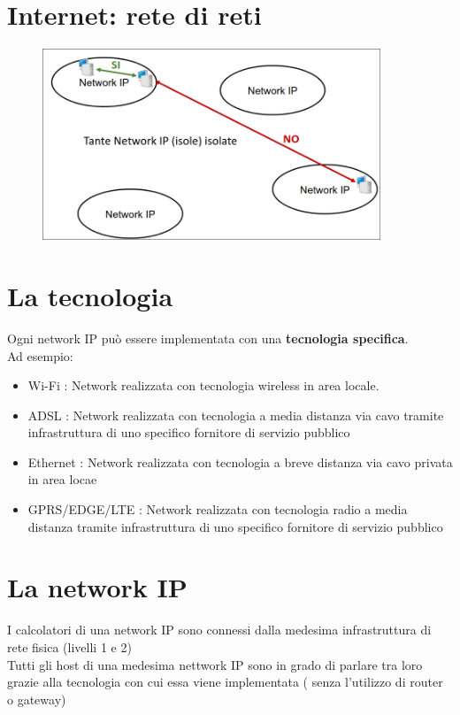 \documentclass{report}
\begin{document}
        \section{Internet: rete di reti}
             \begin{figure}[H]
                    \includegraphics[width=0.9\textwidth]{1/rdr.png}
                \end{figure}
            \section{La tecnologia}
                Ogni network IP può essere implementata con una \textbf{tecnologia specifica}.
                \\
                Ad esempio:
                \begin{itemize}
                    \item Wi-Fi : Network realizzata con tecnologia wireless in area locale.
                    \item ADSL : Network realizzata con tecnologia a media distanza via cavo  tramite infrastruttura di uno specifico fornitore di servizio pubblico
                    \item Ethernet : Network realizzata con tecnologia a breve distanza via cavo privata in area locae
                    \item GPRS/EDGE/LTE :  Network realizzata con tecnologia radio a media distanza tramite infrastruttura di uno specifico fornitore di servizio pubblico
                \end{itemize}
            \section{La network IP}
                I calcolatori di una network IP sono connessi dalla medesima infrastruttura di rete fisica (livelli 1 e 2)
                \\ 
                Tutti gli host di una medesima nettwork IP sono in grado di parlare tra loro grazie alla tecnologia con cui essa viene implementata ( senza l'utilizzo di router o gateway)
\end{document}
